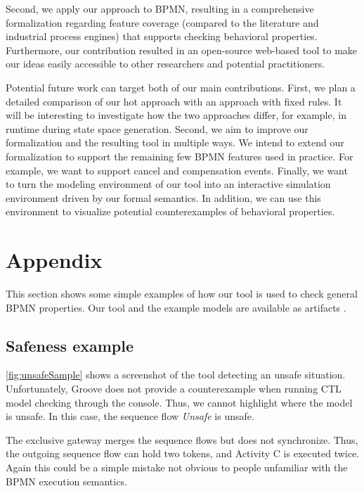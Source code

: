 \documentclass[runningheads]{llncs}
\begin{document}
Second, we apply our approach to BPMN, resulting in a comprehensive formalization regarding feature coverage (compared to the literature and industrial process engines) that supports checking behavioral properties.
Furthermore, our contribution resulted in an open-source web-based tool to make our ideas easily accessible to other researchers and potential practitioners.

Potential future work can target both of our main contributions.
First, we plan a detailed comparison of our \gls*{hot} approach with an approach with fixed rules.
It will be interesting to investigate how the two approaches differ, for example, in runtime during state space generation.
Second, we aim to improve our formalization and the resulting tool in multiple ways.
We intend to extend our formalization to support the remaining few BPMN features used in practice.
For example, we want to support cancel and compensation events.
Finally, we want to turn the modeling environment of our tool into an interactive simulation environment driven by our formal semantics.
In addition, we can use this environment to visualize potential counterexamples of behavioral properties.

 


\section{Appendix}


This section shows some simple examples of how our tool is used to check general BPMN properties.
Our tool and the example models are available as artifacts \cite{krauterArtifactsICGT2023}.

\subsection{Safeness example}
\autoref{fig:unsafeSample} shows a screenshot of the tool detecting an unsafe situation.
Unfortunately, Groove does not provide a counterexample when running CTL model checking through the console.
Thus, we cannot highlight where the model is unsafe.
In this case, the sequence flow \textit{Unsafe} is unsafe.

The exclusive gateway merges the sequence flows but does not synchronize.
Thus, the outgoing sequence flow can hold two tokens, and Activity C is executed twice.
Again this could be a simple mistake not obvious to people unfamiliar with the BPMN execution semantics.
\end{document}
